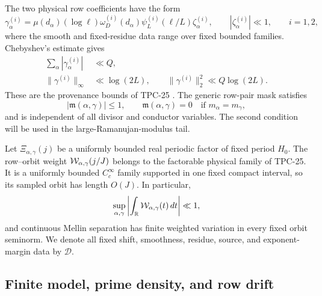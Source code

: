 The two physical row coefficients have the form
\begin{equation}
 \gamma_\alpha^{(i)}
 =\mu(d_\alpha)(\log\ell)\omega_D^{(i)}(d_\alpha)
  \psi_L^{(i)}(\ell/L)\zeta_\alpha^{(i)},
 \qquad |\zeta_\alpha^{(i)}|\ll1,
 \qquad i=1,2,
 \label{eq:tpc27-row-provenance}
\end{equation}
where the smooth and fixed-residue data range over fixed bounded
families.  Chebyshev's estimate gives
\begin{align}
 \sum_\alpha|\gamma_\alpha^{(i)}|&\ll Q,
 \label{eq:tpc27-row-l1}\\
 \|\gamma^{(i)}\|_\infty&\ll\log(2L),
 \qquad
 \|\gamma^{(i)}\|_2^2\ll Q\log(2L).
 \label{eq:tpc27-row-l2}
\end{align}
These are the provenance bounds of TPC-25
\citep{WangTPC25}.  The generic row-pair mask satisfies
\begin{equation}
 |\mathfrak m(\alpha,\gamma)|\le1,
 \qquad
 \mathfrak m(\alpha,\gamma)=0
 \quad\text{if }m_\alpha=m_\gamma,
 \label{eq:tpc27-mask}
\end{equation}
and is independent of all divisor and conductor variables.  The second
condition will be used in the large-Ramanujan-modulus tail.

Let \(\Xi_{\alpha,\gamma}(j)\) be a uniformly bounded real periodic
factor of fixed period \(H_0\).  The row--orbit weight
\(\mathcal W_{\alpha,\gamma}(j/J)\) belongs to the factorable physical family
of TPC-25.  It is a uniformly bounded \(C_c^\infty\) family supported
in one fixed compact interval, so its sampled orbit has length
\(O(J)\).  In particular,
\begin{equation}
 \sup_{\alpha,\gamma}
 \left|\int_\mathbb R\mathcal W_{\alpha,\gamma}(t)\,dt\right|\ll1,
 \label{eq:tpc27-zero-functional}
\end{equation}
and continuous Mellin separation has finite weighted variation in
every fixed orbit seminorm.  We denote all fixed shift, smoothness,
residue, source, and exponent-margin data by \(\mathscr D\).

\subsection{Finite model, prime density, and row drift}

